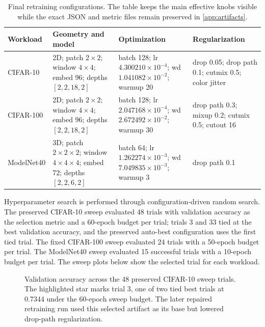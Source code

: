 \begin{table}[t]
  \centering
  \scriptsize
  \caption{Final retraining configurations. The table keeps the main effective knobs visible while the exact JSON and metric files remain preserved in \autoref{app:artifacts}.}
  \label{tab:retrain-configs}
  \begin{tabularx}{\linewidth}{@{}lYYY@{}}
    \toprule
    \textbf{Workload} & \textbf{Geometry and model} & \textbf{Optimization} & \textbf{Regularization} \\
    \midrule
    CIFAR-10 & 2D; patch \(2 \times 2\); window \(4 \times 4\); embed 96; depths \([2,2,18,2]\) & batch 128; lr \(4.300210 \times 10^{-4}\); wd \(1.041082 \times 10^{-2}\); warmup 20 & drop 0.05; drop path 0.1; cutmix 0.5; color jitter \\
    CIFAR-100 & 2D; patch \(2 \times 2\); window \(4 \times 4\); embed 96; depths \([2,2,18,2]\) & batch 128; lr \(2.047168 \times 10^{-4}\); wd \(2.672492 \times 10^{-2}\); warmup 30 & drop path 0.3; mixup 0.2; cutmix 0.5; cutout 16 \\
    ModelNet40 & 3D; patch \(2 \times 2 \times 2\); window \(4 \times 4 \times 4\); embed 72; depths \([2,2,6,2]\) & batch 64; lr \(1.262274 \times 10^{-3}\); wd \(7.049835 \times 10^{-3}\); warmup 3 & drop path 0.1 \\
    \bottomrule
  \end{tabularx}
\end{table}

Hyperparameter search is performed through configuration-driven random search. The preserved CIFAR-10 sweep evaluated 48 trials with validation accuracy as the selection metric and a 60-epoch budget per trial; trials 3 and 33 tied at the best validation accuracy, and the preserved auto-best configuration uses the first tied trial. The fixed CIFAR-100 sweep evaluated 24 trials with a 50-epoch budget per trial. The ModelNet40 sweep evaluated 15 successful trials with a 10-epoch budget per trial. The sweep plots below show the selected trial for each workload.

\begin{figure}[t]
  \centering
  
  \caption{Validation accuracy across the 48 preserved CIFAR-10 sweep trials. The highlighted star marks trial 3, one of two tied best trials at 0.7344 under the 60-epoch sweep budget. The later repaired retraining run used this selected artifact as its base but lowered drop-path regularization.}
  \label{fig:cifar10-sweep}
\end{figure}

